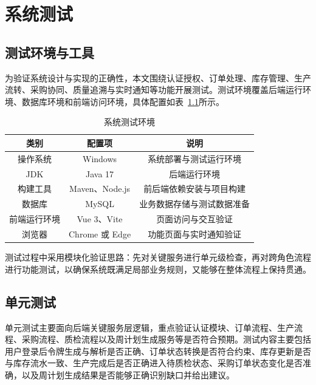 \chapter{系统测试}

\section{测试环境与工具}

为验证系统设计与实现的正确性，本文围绕认证授权、订单处理、库存管理、生产流转、采购协同、质量追溯与实时通知等功能开展测试。测试环境覆盖后端运行环境、数据库环境和前端访问环境，具体配置如表~\ref{tab:test-env}所示。

\begin{table}[htbp]
\centering
\footnotesize
\caption{系统测试环境}
\label{tab:test-env}
\begin{tabular}{|c|c|c|}
\hline
类别 & 配置项 & 说明 \\\hline
操作系统 & Windows & 系统部署与测试运行环境 \\\hline
JDK & Java 17 & 后端运行环境 \\\hline
构建工具 & Maven、Node.js & 前后端依赖安装与项目构建 \\\hline
数据库 & MySQL & 业务数据存储与测试数据准备 \\\hline
前端运行环境 & Vue 3、Vite & 页面访问与交互验证 \\\hline
浏览器 & Chrome 或 Edge & 功能页面与实时通知验证 \\\hline
\end{tabular}
\end{table}

测试过程中采用模块化验证思路：先对关键服务进行单元级检查，再对跨角色流程进行功能测试，以确保系统既满足局部业务规则，又能够在整体流程上保持贯通。

\section{单元测试}

单元测试主要面向后端关键服务层逻辑，重点验证认证模块、订单流程、生产流程、采购流程、质检流程以及周计划生成服务等是否符合预期。测试内容主要包括用户登录后令牌生成与解析是否正确、订单状态转换是否符合约束、库存更新是否与库存流水一致、生产完成后是否正确进入待质检状态、采购订单状态变化是否准确，以及周计划生成结果是否能够正确识别缺口并给出建议。

